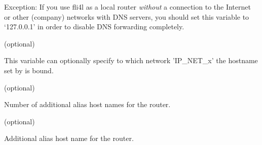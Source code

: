 \begin{description}
{      Exception: If you use fli4l as a local router \emph{without} a connection
      to the Internet or other (company) networks with DNS servers, you should
      set this variable to `127.0.0.1' in order to disable DNS forwarding
      completely.}

     (optional)

    {This variable can optionally specify to which network 'IP\_NET\_x' the
     hostname set by  is bound.}

     (optional)

    {Number of additional alias host names for the router.}

     (optional)

    {Additional alias host name for the router.}

  \end{description}
